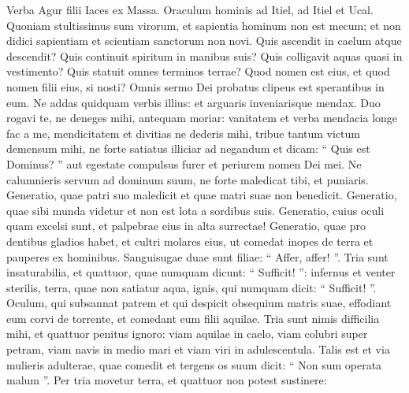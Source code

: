 \begin{biblechapter}
\begin{biblechapter}
\begin{biblechapter}
\begin{biblechapter}
\begin{biblechapter}
\begin{biblechapter}
\begin{biblechapter}
\begin{biblechapter}
\begin{biblechapter}
\begin{biblechapter}
\begin{biblechapter}
\begin{biblechapter}
\begin{biblechapter}
\begin{biblechapter}
\begin{biblechapter}
\begin{biblechapter}
\begin{biblechapter}
\begin{biblechapter}
\begin{biblechapter}
\begin{biblechapter}
\begin{biblechapter}
\begin{biblechapter}
\begin{biblechapter}
\begin{biblechapter}
\begin{biblechapter}
\begin{biblechapter}
\begin{biblechapter}
\begin{biblechapter}
\begin{biblechapter}
\begin{biblechapter}
 \verse Verba Agur filii Iaces ex Massa.
 Oraculum hominis ad Itiel,
 ad Itiel et Ucal.
 \verse Quoniam stultissimus sum virorum,
 et sapientia hominum non est mecum;
 \verse et non didici sapientiam
 et scientiam sanctorum non novi.
 \verse Quis ascendit in caelum atque descendit?
 Quis continuit spiritum in manibus suis?
 Quis colligavit aquas quasi in vestimento?
 Quis statuit omnes terminos terrae?
 Quod nomen est eius, et quod nomen filii eius, si nosti?
 \verse Omnis sermo Dei probatus
 clipeus est sperantibus in eum.
 \verse Ne addas quidquam verbis illius:
 et arguaris inveniarisque mendax.
 \verse Duo rogavi te,
 ne deneges mihi, antequam moriar:
 \verse vanitatem et verba mendacia longe fac a me,
 mendicitatem et divitias ne dederis mihi,
 tribue tantum victum demensum mihi,
 \verse ne forte satiatus illiciar ad negandum
 et dicam: “ Quis est Dominus? ”
 aut egestate compulsus furer
 et periurem nomen Dei mei.
 \verse Ne calumnieris servum ad dominum suum,
 ne forte maledicat tibi, et puniaris.
 \verse Generatio, quae patri suo maledicit
 et quae matri suae non benedicit.
 \verse Generatio, quae sibi munda videtur
 et non est lota a sordibus suis.
 \verse Generatio, cuius oculi quam excelsi sunt,
 et palpebrae eius in alta surrectae!
 \verse Generatio, quae pro dentibus gladios habet,
 et cultri molares eius,
 ut comedat inopes de terra
 et pauperes ex hominibus.
 \verse Sanguisugae duae sunt filiae:
 “ Affer, affer! ”.
 Tria sunt insaturabilia,
 et quattuor, quae numquam dicunt: “ Sufficit! ”:
 \verse infernus et venter sterilis,
 terra, quae non satiatur aqua,
 ignis, qui numquam dicit: “ Sufficit! ”.
 \verse Oculum, qui subsannat patrem
 et qui despicit obsequium matris suae,
 effodiant eum corvi de torrente,
 et comedant eum filii aquilae.
 \verse Tria sunt nimis difficilia mihi,
 et quattuor penitus ignoro:
 \verse viam aquilae in caelo,
 viam colubri super petram,
 viam navis in medio mari
 et viam viri in adulescentula.
 \verse Talis est et via mulieris adulterae,
 quae comedit et tergens os suum dicit:
 “ Non sum operata malum ”.
 \verse Per tria movetur terra,
 et quattuor non potest sustinere:

\end{biblechapter}
\end{biblechapter}
\end{biblechapter}
\end{biblechapter}
\end{biblechapter}
\end{biblechapter}
\end{biblechapter}
\end{biblechapter}
\end{biblechapter}
\end{biblechapter}
\end{biblechapter}
\end{biblechapter}
\end{biblechapter}
\end{biblechapter}
\end{biblechapter}
\end{biblechapter}
\end{biblechapter}
\end{biblechapter}
\end{biblechapter}
\end{biblechapter}
\end{biblechapter}
\end{biblechapter}
\end{biblechapter}
\end{biblechapter}
\end{biblechapter}
\end{biblechapter}
\end{biblechapter}
\end{biblechapter}
\end{biblechapter}
\end{biblechapter}
